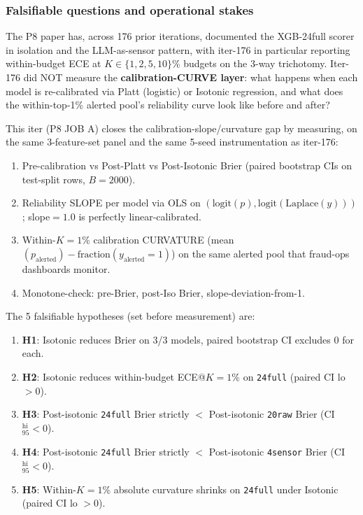 
\subsubsection{Falsifiable questions and operational stakes}\label{sec:p8-iter180-calib}
The P8 paper has, across 176 prior iterations, documented the XGB-24full
scorer in isolation and the LLM-as-sensor pattern, with iter-176 in
particular reporting within-budget ECE at $K\in\{1,2,5,10\}\%$ budgets
on the 3-way trichotomy. Iter-176 did NOT measure the
\textbf{calibration-CURVE layer}: what happens when each model is
re-calibrated via Platt (logistic) or Isotonic regression, and what
does the within-top-1\% alerted pool's reliability curve look like
before and after?

This iter (P8 JOB A) closes the calibration-slope/curvature gap by
measuring, on the same 3-feature-set panel and the same 5-seed
instrumentation as iter-176:
\begin{enumerate}
\item Pre-calibration vs Post-Platt vs Post-Isotonic Brier
  (paired bootstrap CIs on test-split rows, $B{=}2000$).
\item Reliability SLOPE per model via OLS on
  $(\mathrm{logit}(p), \mathrm{logit}(\mathrm{Laplace}(y)))$;
  slope${=}1.0$ is perfectly linear-calibrated.
\item Within-$K{=}1\%$ calibration CURVATURE
  (mean$(p_{\mathrm{alerted}}) - \mathrm{fraction}(y_{\mathrm{alerted}}{=}1)$)
  on the same alerted pool that fraud-ops dashboards monitor.
\item Monotone-check: pre-Brier, post-Iso Brier, slope-deviation-from-1.
\end{enumerate}

The 5 falsifiable hypotheses (set before measurement) are:
\begin{enumerate}
\item \textbf{H1}: Isotonic reduces Brier on 3/3 models, paired bootstrap
  CI excludes 0 for each.
\item \textbf{H2}: Isotonic reduces within-budget ECE@$K{=}1\%$ on
  \texttt{24full} (paired CI lo $> 0$).
\item \textbf{H3}: Post-isotonic \texttt{24full} Brier strictly $<$
  Post-isotonic \texttt{20raw} Brier (CI$_{95}^{\mathrm{hi}} < 0$).
\item \textbf{H4}: Post-isotonic \texttt{24full} Brier strictly $<$
  Post-isotonic \texttt{4sensor} Brier (CI$_{95}^{\mathrm{hi}} < 0$).
\item \textbf{H5}: Within-$K{=}1\%$ absolute curvature shrinks on
  \texttt{24full} under Isotonic (paired CI lo $> 0$).
\end{enumerate}

